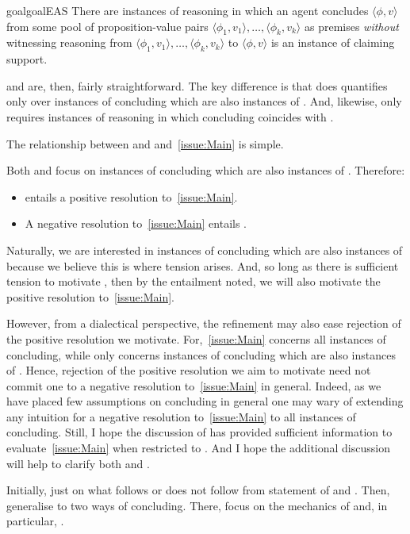 \begin{note}
  \begin{restatable}{goal}{goalEAS}
    \label{prop:EAS}
    There are instances of reasoning in which an agent concludes \(\langle \phi,v \rangle\) from some pool of proposition-value pairs \(\langle \phi_{1},v_{1} \rangle,\dots,\langle \phi_{k},v_{k} \rangle\) as premises \emph{without} witnessing reasoning from \(\langle \phi_{1},v_{1} \rangle,\dots,\langle \phi_{k},v_{k} \rangle\) to \(\langle \phi,v \rangle\) is an instance of claiming support.
  \end{restatable}
\end{note}

\begin{note}
  \ESU{} and \EAS{} are, then, fairly straightforward.
  The key difference is that \ESU{} does quantifies only over instances of concluding which are also instances of .
  And, likewise, \EAS{} only requires instances of reasoning in which concluding coincides with .
\end{note}

\begin{note}
  The relationship between \ESU{} and \EAS{} and~\autoref{issue:Main} is simple.

  Both \EAS{} and \ESU{} focus on instances of concluding which are also instances of .
  Therefore:
  \begin{itemize}
  \item
    \EAS{} entails a positive resolution to~\autoref{issue:Main}.
  \item
    A negative resolution to~\autoref{issue:Main} entails \ESU{}.
  \end{itemize}
  Naturally, we are interested in instances of concluding which are also instances of  because we believe this is where tension arises.
  And, so long as there is sufficient tension to motivate \EAS{}, then by the entailment noted, we will also motivate the positive resolution to~\autoref{issue:Main}.

  However, from a dialectical perspective, the refinement may also ease rejection of the positive resolution we motivate.
  For,~\autoref{issue:Main} concerns all instances of concluding, while \ESU{} only concerns instances of concluding which are also instances of \csVImp{}.
  Hence, rejection of the positive resolution we aim to motivate need not commit one to a negative resolution to~\autoref{issue:Main} in general.
  Indeed, as we have placed few assumptions on concluding in general one may wary of extending any intuition for a negative resolution to~\autoref{issue:Main} to all instances of concluding.
  Still, I hope the discussion of  has provided sufficient information to evaluate~\autoref{issue:Main} when restricted to .
  And I hope the additional discussion will help to clarify both \ESU{} and \EAS{}.

  {
    \color{red}
    Initially, just on what follows or does not follow from statement of \ESU{} and \EAS{}.
    Then, generalise to two ways of concluding.
    There, focus on the mechanics of \ESU{} and, in particular, \EAS{}.
  }
\end{note}

